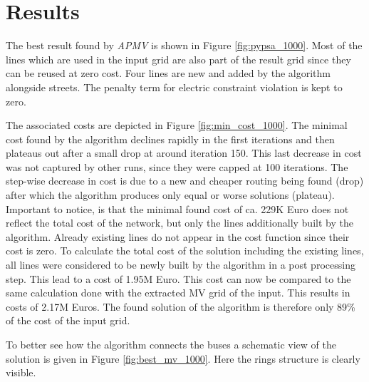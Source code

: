 %

\section{Results}



The best result found by \textit{APMV} is shown in Figure \ref{fig:pypsa_1000}. Most of the lines which are used in the input grid are also part of the result grid since they can be reused at zero cost. Four lines are new and added by the algorithm alongside streets. The penalty term for electric constraint violation is kept to zero.



The associated costs are depicted in Figure \ref{fig:min_cost_1000}. The minimal cost found by the algorithm declines rapidly in the first iterations and then plateaus out after a small drop at around iteration 150. This last decrease in cost was not captured by other runs, since they were capped at 100 iterations. The step-wise decrease in cost is due to a new and cheaper routing being found (drop) after which the algorithm produces only equal or worse solutions (plateau). Important to notice, is that the minimal found cost of ca. 229K Euro does not reflect the total cost of the network, but only the lines additionally built by the algorithm. Already existing lines do not appear in the cost function since their cost is zero. To calculate the total cost of the solution including the existing lines, all lines were considered to be newly built by the algorithm in a post processing step. This lead to a cost of 1.95M Euro. This cost can now be compared to the same calculation done with the extracted MV grid of the input. This results in costs of 2.17M Euros. The found solution of the algorithm is therefore only 89\% of the cost of the input grid.





To better see how the algorithm connects the buses a schematic view of the solution is given in Figure \ref{fig:best_mv_1000}. Here the rings structure is clearly visible. 





